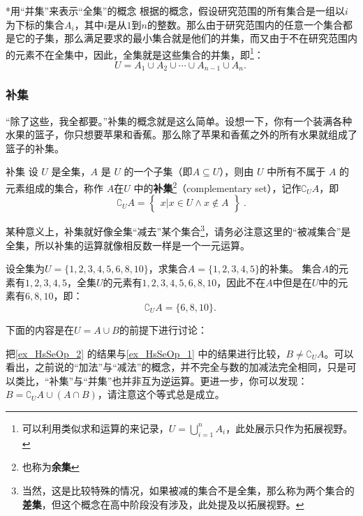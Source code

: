 \begin{example}{*用“并集”来表示“全集”的概念}
根据的概念，假设研究范围的所有集合是一组以$i$为下标的集合$A_i$，其中$i$是从$1$到$n$的整数。那么由于研究范围内的任意一个集合都是它的子集，那么满足要求的最小集合就是他们的并集，而又由于不在研究范围内的元素不在全集中，因此，全集就是这些集合的并集，即\footnote{可以利用类似求和运算的来记录，$\displaystyle U=\bigcup_{i=1}^n A_i$，此处展示只作为拓展视野。}：
$$
U=A_1\cup A_2\cup \cdots \cup A_{n-1}\cup A_n.~
$$
\end{example}


\subsubsection{补集}

“除了这些，我全都要。”补集的概念就是这么简单。设想一下，你有一个装满各种水果的篮子，你只想要苹果和香蕉。那么除了苹果和香蕉之外的所有水果就组成了篮子的补集。

\begin{definition}{补集}\label{def_HsSeOp_1}
设 $U$ 是全集，$A$ 是 $U$ 的一个子集（即$A\subseteq U$），则由 $U$ 中所有不属于 $A$ 的元素组成的集合，称作 $A$在$U$ 中的\textbf{补集}\footnote{也称为\textbf{余集}}（complementary set），记作$\complement_UA$，即
\begin{equation}
\complement_UA = \begin{Bmatrix}x|x\in U \wedge x\notin A\end{Bmatrix}~.
\end{equation}
\end{definition}


某种意义上，补集就好像全集“减去”某个集合\footnote{当然，这是比较特殊的情况，如果被减的集合不是全集，那么称为两个集合的\textbf{差集}，但这个概念在高中阶段没有涉及，此处提及以拓展视野。}，请务必注意这里的“被减集合”是全集，所以补集的运算就像相反数一样是一个一元运算。

\begin{example}{设全集为$U=\{1,2,3,4,5,6,8,10\}$，求集合$A=\{1,2,3,4,5\}$的补集。}\label{ex_HsSeOp_2}
集合$A$的元素有$1,2,3,4,5$，全集$U$的元素有$1,2,3,4,5,6,8,10$，因此不在$A$中但是在$U$中的元素有$6,8,10$，即：
$$
\complement_UA=\{6,8,10\}.~
$$
\end{example}

下面的内容是在$U=A\cup B$的前提下进行讨论：

把\autoref{ex_HsSeOp_2} 的结果与\autoref{ex_HsSeOp_1} 中的结果进行比较，$B\neq\complement_UA$。可以看出，之前说的“加法”与“减法”的概念，并不完全与数的加减法完全相同，只是可以类比，“补集”与“并集”也并非互为逆运算。更进一步，你可以发现：$\displaystyle B=\complement_{U}A\cup(A\cap B)$，请注意这个等式总是成立。

